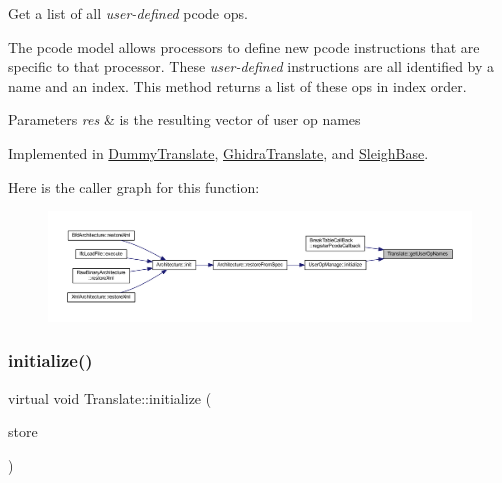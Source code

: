 Get a list of all {\itshape user-\/defined} pcode ops. 

The pcode model allows processors to define new pcode instructions that are specific to that processor. These {\itshape user-\/defined} instructions are all identified by a name and an index. This method returns a list of these ops in index order. 
\begin{DoxyParams}{Parameters}
{\em res} & is the resulting vector of user op names \\
\hline
\end{DoxyParams}


Implemented in \mbox{\hyperlink{class_dummy_translate_aa60999d42adf6fddc6fb57437ffb79c3}{Dummy\+Translate}}, \mbox{\hyperlink{class_ghidra_translate_ac9f3a84c329f1432ebcc38be53b32495}{Ghidra\+Translate}}, and \mbox{\hyperlink{class_sleigh_base_a5a3a4777d4e63afce414c17bf23617dd}{Sleigh\+Base}}.

Here is the caller graph for this function\+:
\nopagebreak
\begin{figure}[H]
\begin{center}
\leavevmode
\includegraphics[width=350pt]{class_translate_a2475ba8a71e0d514903b3b5458e6cf45_icgraph}
\end{center}
\end{figure}
\mbox{\label{class_translate_af8e71e9a9477e9a91be400ecca565df5}} 
\subsubsection{\texorpdfstring{initialize()}{initialize()}}
{\footnotesize\ttfamily virtual void Translate\+::initialize (\begin{DoxyParamCaption}\item[{\mbox{\hyperlink{class_document_storage}{Document\+Storage}} \&}]{store }\end{DoxyParamCaption})\hspace{0.3cm}{\ttfamily [pure virtual]}}



